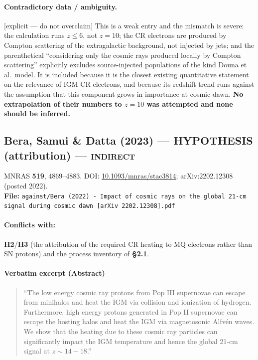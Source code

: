 \documentclass[11pt,a4paper]{article}
\newcommand{\HYP}{\textcolor{blue!60!black}{\textbf{HYPOTHESIS}}}
\newcommand{\flag}[1]{\textcolor{orange!75!black}{\textsf{\small [#1]}}}
\begin{document}
\paragraph{Contradictory data / ambiguity.} \flag{explicit --- do not overclaim}
This is a weak entry and the mismatch is severe: the calculation runs
$z\le6$, not $z=10$; the CR electrons are produced by Compton scattering of
the extragalactic background, not injected by jets; and the parenthetical
``considering only the cosmic rays produced locally by Compton scattering''
explicitly excludes source-injected populations of the kind Douna et al.\ model.
It is included because it is the closest existing quantitative statement on the
relevance of IGM CR electrons, and because its redshift trend runs against the
assumption that this component grows in importance at cosmic dawn.
\textbf{No extrapolation of their numbers to $z=10$ was attempted and none
should be inferred.}

\subsection{Bera, Samui \& Datta (2023) --- \HYP{} (attribution) --- \textsc{indirect}}
\noindent MNRAS \textbf{519}, 4869--4883. DOI:
\href{https://doi.org/10.1093/mnras/stac3814}{10.1093/mnras/stac3814};
arXiv:2202.12308 (posted 2022).\\
\textbf{File:} \texttt{against/Bera (2022) - Impact of cosmic rays on the global 21-cm signal during cosmic dawn [arXiv 2202.12308].pdf}

\paragraph{Conflicts with:} \textbf{H2}/\textbf{H3} (the attribution of the
required CR heating to MQ electrons rather than SN protons) and the process
inventory of \textbf{\S2.1}.

\paragraph{Verbatim excerpt (Abstract)}
\begin{quote}\small
``The low energy cosmic ray protons from Pop III supernovae can escape from
minihalos and heat the IGM via collision and ionization of hydrogen. Furthermore,
high energy protons generated in Pop II supernovae can escape the hosting halos
and heat the IGM via magnetosonic Alfv\'en waves. We show that the heating due to
these cosmic ray particles can significantly impact the IGM temperature and hence
the global 21-cm signal at $z\sim14-18$.''
\end{quote}
\end{document}
